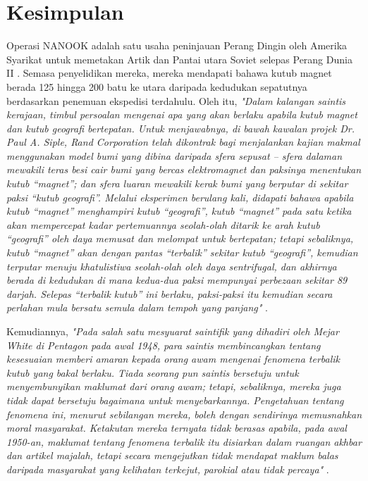 \documentclass[10pt,twocolumn,letterpaper]{article}
\begin{document}
\section{Kesimpulan}

Operasi NANOOK adalah satu usaha peninjauan Perang Dingin oleh Amerika Syarikat untuk memetakan Artik dan Pantai utara Soviet selepas Perang Dunia II \cite{137}. Semasa penyelidikan mereka, mereka mendapati bahawa kutub magnet berada 125 hingga 200 batu ke utara daripada kedudukan sepatutnya berdasarkan penemuan ekspedisi terdahulu. Oleh itu, \textit{"Dalam kalangan saintis kerajaan, timbul persoalan mengenai apa yang akan berlaku apabila kutub magnet dan kutub geografi bertepatan. Untuk menjawabnya, di bawah kawalan projek Dr. Paul A. Siple, Rand Corporation telah dikontrak bagi menjalankan kajian makmal menggunakan model bumi yang dibina daripada sfera sepusat – sfera dalaman mewakili teras besi cair bumi yang bercas elektromagnet dan paksinya menentukan kutub “magnet”; dan sfera luaran mewakili kerak bumi yang berputar di sekitar paksi “kutub geografi”. Melalui eksperimen berulang kali, didapati bahawa apabila kutub “magnet” menghampiri kutub “geografi”, kutub “magnet” pada satu ketika akan mempercepat kadar pertemuannya seolah-olah ditarik ke arah kutub “geografi” oleh daya memusat dan melompat untuk bertepatan; tetapi sebaliknya, kutub “magnet” akan dengan pantas “terbalik” sekitar kutub “geografi”, kemudian terputar menuju khatulistiwa seolah-olah oleh daya sentrifugal, dan akhirnya berada di kedudukan di mana kedua-dua paksi mempunyai perbezaan sekitar 89 darjah. Selepas “terbalik kutub” ini berlaku, paksi-paksi itu kemudian secara perlahan mula bersatu semula dalam tempoh yang panjang"} \cite{138,139}.

Kemudiannya, \textit{"Pada salah satu mesyuarat saintifik yang dihadiri oleh Mejar White di Pentagon pada awal 1948, para saintis membincangkan tentang kesesuaian memberi amaran kepada orang awam mengenai fenomena terbalik kutub yang bakal berlaku. Tiada seorang pun saintis bersetuju untuk menyembunyikan maklumat dari orang awam; tetapi, sebaliknya, mereka juga tidak dapat bersetuju bagaimana untuk menyebarkannya. Pengetahuan tentang fenomena ini, menurut sebilangan mereka, boleh dengan sendirinya memusnahkan moral masyarakat. Ketakutan mereka ternyata tidak berasas apabila, pada awal 1950-an, maklumat tentang fenomena terbalik itu disiarkan dalam ruangan akhbar dan artikel majalah, tetapi secara mengejutkan tidak mendapat maklum balas daripada masyarakat yang kelihatan terkejut, parokial atau tidak percaya"} \cite{138,139}.
\end{document}
